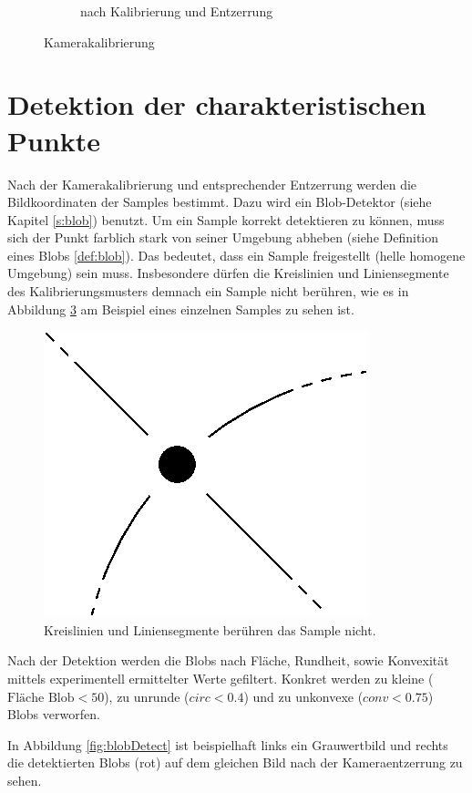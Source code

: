 \begin{figure}[!htb]
\begin{subfigure}{.5\textwidth}
	\caption{nach Kalibrierung und Entzerrung}
	\label{fig:calibUndist}
\end{subfigure}
\caption{Kamerakalibrierung}
\label{fig:calib}
\end{figure}

\section{Detektion der charakteristischen Punkte}

Nach der Kamerakalibrierung und entsprechender Entzerrung werden die Bildkoordinaten der Samples bestimmt. Dazu wird ein Blob-Detektor (siehe Kapitel \ref{s:blob}) benutzt.
Um ein Sample korrekt detektieren zu können, muss sich der Punkt farblich stark von seiner Umgebung abheben (siehe Definition eines Blobs \ref{def:blob}). Das bedeutet, dass ein Sample freigestellt (helle homogene Umgebung) sein muss. Insbesondere dürfen die Kreislinien und Liniensegmente des Kalibrierungsmusters demnach ein Sample nicht berühren, wie es in Abbildung \ref{fig:calibPatternLines} am Beispiel eines einzelnen Samples zu sehen ist.

\begin{figure}[!htb]
	\centering
	\includegraphics[width=.25\textwidth]{images/calibrationPatternLines.eps}
	\caption{Kreislinien und Liniensegmente berühren das Sample nicht.}
	\label{fig:calibPatternLines}
\end{figure}

Nach der Detektion werden die Blobs nach Fläche, Rundheit, sowie Konvexität mittels experimentell ermittelter Werte gefiltert. Konkret werden zu kleine ($\textrm{Fläche Blob} < 50$), zu unrunde ($circ < 0.4$) und zu unkonvexe ($conv < 0.75$) Blobs verworfen.

In Abbildung \ref{fig:blobDetect} ist beispielhaft links ein Grauwertbild und rechts die detektierten Blobs (rot) auf dem gleichen Bild nach der Kameraentzerrung zu sehen.


